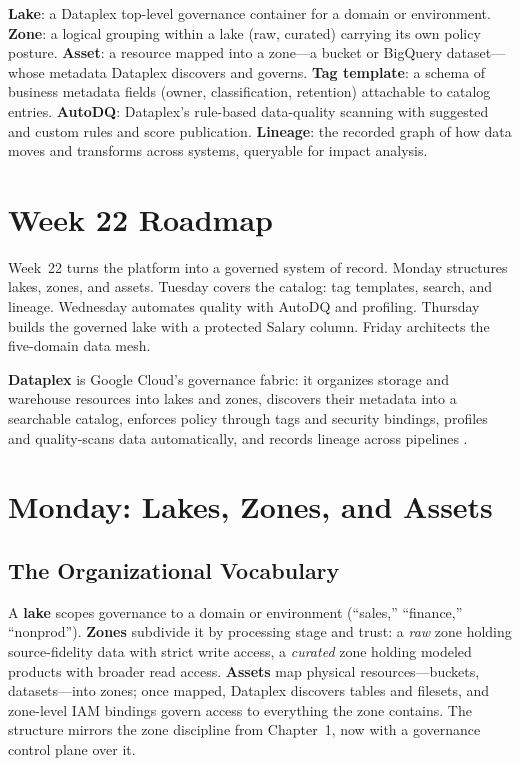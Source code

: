 \begin{keyterms}
\textbf{Lake}: a Dataplex top-level governance container for a domain or environment.
\textbf{Zone}: a logical grouping within a lake (raw, curated) carrying its own policy posture.
\textbf{Asset}: a resource mapped into a zone---a bucket or BigQuery dataset---whose metadata Dataplex discovers and governs.
\textbf{Tag template}: a schema of business metadata fields (owner, classification, retention) attachable to catalog entries.
\textbf{AutoDQ}: Dataplex's rule-based data-quality scanning with suggested and custom rules and score publication.
\textbf{Lineage}: the recorded graph of how data moves and transforms across systems, queryable for impact analysis.
\end{keyterms}

\section{Week 22 Roadmap}
Week~22 turns the platform into a governed system of record. Monday structures lakes, zones, and assets. Tuesday covers the catalog: tag templates, search, and lineage. Wednesday automates quality with AutoDQ and profiling. Thursday builds the governed lake with a protected Salary column. Friday architects the five-domain data mesh.

\begin{definitionbox}
\textbf{Dataplex} is Google Cloud's governance fabric: it organizes storage and warehouse resources into lakes and zones, discovers their metadata into a searchable catalog, enforces policy through tags and security bindings, profiles and quality-scans data automatically, and records lineage across pipelines \cite{googleclouddataplexdocs}.
\end{definitionbox}

\section{Monday: Lakes, Zones, and Assets}

\subsection{The Organizational Vocabulary}
A \textbf{lake} scopes governance to a domain or environment (``sales,'' ``finance,'' ``nonprod''). \textbf{Zones} subdivide it by processing stage and trust: a \emph{raw} zone holding source-fidelity data with strict write access, a \emph{curated} zone holding modeled products with broader read access. \textbf{Assets} map physical resources---buckets, datasets---into zones; once mapped, Dataplex discovers tables and filesets, and zone-level IAM bindings govern access to everything the zone contains. The structure mirrors the zone discipline from Chapter~1, now with a governance control plane over it.

